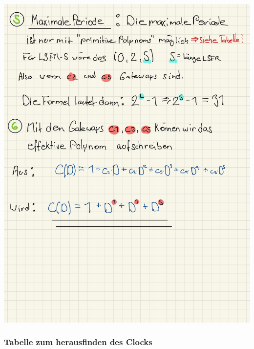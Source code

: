 \documentclass[11pt]{article}
\begin{document}
\begin{center}
	\includegraphics[scale=0.96]{img/lsfr2_4.jpg}\\

\end{center}

\hypertarget{tabelle-zum-herausfinden-des-clocks}{%
\subsubsection{Tabelle zum herausfinden des
Clocks}\label{tabelle-zum-herausfinden-des-clocks}}
\end{document}
